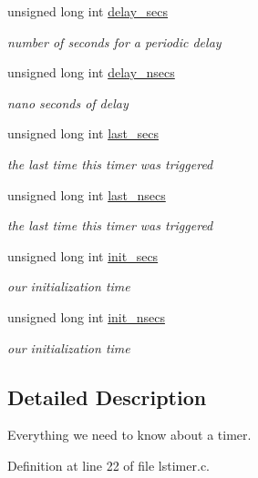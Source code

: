 \begin{DoxyCompactItemize}
unsigned long int \hyperlink{structlstimer__list__struct_a237da48d81b7e039c54901296aeee18e}{delay\-\_\-secs}
\begin{DoxyCompactList}\small\item\em number of seconds for a periodic delay \end{DoxyCompactList}\item 
unsigned long int \hyperlink{structlstimer__list__struct_acb0c6a1600c4168e5dfb2d477a685b29}{delay\-\_\-nsecs}
\begin{DoxyCompactList}\small\item\em nano seconds of delay \end{DoxyCompactList}\item 
unsigned long int \hyperlink{structlstimer__list__struct_ab0ac2907735701cb24ec9af95a1cc787}{last\-\_\-secs}
\begin{DoxyCompactList}\small\item\em the last time this timer was triggered \end{DoxyCompactList}\item 
unsigned long int \hyperlink{structlstimer__list__struct_a19acf5aa7f57aa7ce60537c3d3d6a6af}{last\-\_\-nsecs}
\begin{DoxyCompactList}\small\item\em the last time this timer was triggered \end{DoxyCompactList}\item 
unsigned long int \hyperlink{structlstimer__list__struct_a1222c76d49b149725467aa698abb7fb1}{init\-\_\-secs}
\begin{DoxyCompactList}\small\item\em our initialization time \end{DoxyCompactList}\item 
unsigned long int \hyperlink{structlstimer__list__struct_ad5bb7fa7d669b7ebbe34d8ed2bdb257a}{init\-\_\-nsecs}
\begin{DoxyCompactList}\small\item\em our initialization time \end{DoxyCompactList}\end{DoxyCompactItemize}


\subsection{Detailed Description}
Everything we need to know about a timer. 

Definition at line 22 of file lstimer.\-c.



